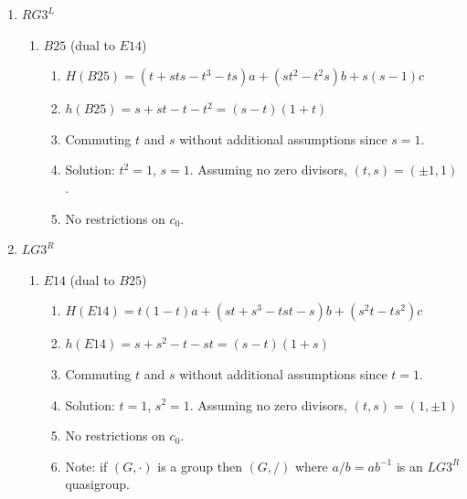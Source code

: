 \documentclass[11pt]{amsart}
\theoremstyle{definition}
\begin{document}
\begin{enumerate}
 \item[(6)] $RG3^L$
        \begin{enumerate}
            \item \textbf{$B25$} (dual to $E14$)
            \begin{enumerate}
                \item  $H(B25) =(t+sts-t^3-ts)a+(st^2-t^2s)b+s(s-1)c $
                \item  $h(B25) = s+st-t-t^2 = (s-t)(1+t)$
                \item Commuting $t$ and $s$ without additional assumptions since $s=1$.
                \item Solution: $t^2=1$, $s=1$. Assuming no zero divisors, $(t,s) = (\pm 1, 1)$.
                \item No restrictions on $c_0$.
            \end{enumerate}
        \end{enumerate}

 \item[(7)] $LG3^R$
        \begin{enumerate}
            \item $E14$ (dual to $B25$)
            \begin{enumerate}
                \item   $H(E14) = t(1-t)a+(st+s^3-tst-s)b+(s^2t-ts^2)c$
                \item  $h(E14) = s+s^2-t-st= (s-t)(1+s)$ 
                \item Commuting $t$ and $s$ without additional assumptions since $t=1$.
                \item Solution: $t=1$, $s^2 = 1$. Assuming no zero divisors, $(t,s) = ( 1, \pm 1)$
                \item No restrictions on $c_0$.
                \item Note:  if $(G,\cdot)$ is a group then $(G,/ )$ where $a/b=ab^{-1}$ is an $LG3^R$ quasigroup.
            \end{enumerate}
        \end{enumerate}


\end{enumerate}
\end{document}
